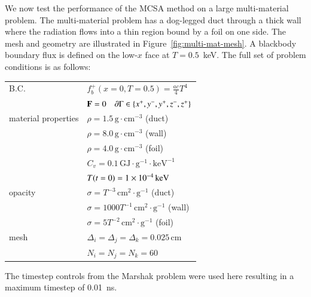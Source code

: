 \documentclass[preprint,12pt]{elsarticle}
\newcommand{\Cv}{\ensuremath{C_{v}}}
\newcommand{\Di}{\ensuremath{\Delta_i}}
\newcommand{\Dj}{\ensuremath{\Delta_j}}
\newcommand{\Dk}{\ensuremath{\Delta_k}}
\begin{document}
We now test the performance of the MCSA method on a large multi-material
problem.  The multi-material problem has a dog-legged duct through a thick
wall where the radiation flows into a thin region bound by a foil on one side.
The mesh and geometry are illustrated in Figure~\ref{fig:multi-mat-mesh}.  A
blackbody boundary flux is defined on the low-$x$ face at $T=0.5$~keV.  The
full set of problem conditions is as follows:
\begin{center}
  \begin{tabular}{ll}\hline
    B.C. & $f_b^{+}(x=0,T=0.5) = \frac{ac}{4}T^4$\\ & $\mathbf{F} =
    0\quad \partial\Gamma \in \{x^{+}, y^{-}, y^{+}, z^{-}, z^{+}\}$
    \\  material properties & $\rho =
    1.5\,\text{g}\cdot\text{cm}^{-3}$ (duct) \\ & $\rho =
    8.0\,\text{g}\cdot\text{cm}^{-3}$ (wall) \\ & $\rho =
    4.0\,\text{g}\cdot\text{cm}^{-3}$ (foil) \\ & $\Cv =
    0.1\,\text{GJ}\cdot\text{g}^{-1}\cdot\text{keV}^{-1}$\\ &
    $T(t=0) = 1\times 10^{-4}\,\text{keV}$\\  opacity & $\sigma =
    T^{-3}\,\text{cm}^2\cdot\text{g}^{-1}$ (duct) \\ & $\sigma =
    1000T^{-1}\,\text{cm}^2\cdot\text{g}^{-1}$ (wall) \\ & $\sigma =
    5T^{-2}\,\text{cm}^2\cdot\text{g}^{-1}$ (foil) \\  mesh & $\Di =
    \Dj = \Dk = 0.025\,\text{cm}$ \\ & $N_i = N_j = N_k = 60$
    \\ \hline
  \end{tabular}
\end{center}
The timestep controls from the Marshak problem were used here resulting in a
maximum timestep of 0.01~ns.
\end{document}
